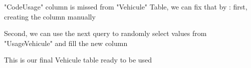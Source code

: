"CodeUsage" column is missed from "Vehicule" Table, we can fix that by : first, creating the column manually
\begin{figure}[H]
\centering
{}
\end{figure}

Second, we can use the next query to randomly select values from "UsageVehicule" and fill the new column
\begin{figure}[H]
\centering
{}
\end{figure}

This is our final Vehicule table ready to be used
\begin{figure}[H]
\centering
{}
\end{figure}


